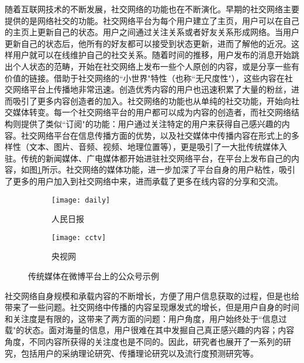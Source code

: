 随着互联网技术的不断发展，社交网络的功能也在不断演化。早期的社交网络主要提供的是网络社交的功能。社交网络平台为每个用户建立了主页，用户可以在自己的主页上更新自己的状态。用户之间通过关注关系或者好友关系形成网络。当用户更新自己的状态后，他所有的好友都可以接受到状态更新，进而了解他的近况。这样用户就可以在线维护自己的社交关系。随着时间的推移，用户发布的消息开始跳出个人状态的范畴，开始在社交网络上发布一些个人原创的内容，或是分享一些有价值的链接。借助于社交网络的``小世界"特性\citep{watts1998collective}（也称``无尺度性"\citep{barabasi1999emergence}）\citep{java2007we}，这些内容在社交网络平台上传播地非常迅速。创造优秀内容的用户也迅速积累了大量的粉丝，进而吸引了更多内容创造者的加入。社交网络的功能也从单纯的社交功能，开始向社交媒体转变\citep{hanna2011we,ellison2007social}。每一个社交网络平台的用户都可以成为内容的创造者，而社交网络结构则提供了类似``订阅"的功能：用户通过关注特定的用户来获得自己感兴趣的内容。社交网络平台在信息传播方面的优势，以及社交媒体中传播内容在形式上的多样性（文本、图片、音频、视频、地理位置等），更是吸引了一大批传统媒体入驻。传统的新闻媒体、广电媒体都开始进驻社交网络平台，在平台上发布自己的内容，如图\ref{fig:socialMedia}所示。社交网络的媒体功能，进一步加深了平台自身的用户粘性，吸引了更多的用户加入到社交网络中来，进而承载了更多在线内容的分享和交流。
\begin{figure}[!htb]
  \centering
  \begin{subfigure}[b]{0.4\textwidth}
    \texttt{[image: daily]}
    \caption{人民日报}
  \end{subfigure}%
  \hspace{0.05\textwidth}
  \begin{subfigure}[b]{0.4\textwidth}
    \texttt{[image: cctv]}
    \caption{央视网}
  \end{subfigure}
  \caption{传统媒体在微博平台上的公众号示例}
  \label{fig:socialMedia}
\end{figure}

社交网络自身规模和承载内容的不断增长，方便了用户信息获取的过程，但是也给带来了一些问题。社交网络中传播的内容呈现爆发式的增长，但是用户自身的时间和关注度是有限的，这带来了两方面的问题：用户角度，用户始终处于``信息过载"的状态。面对海量的信息，用户很难在其中发掘自己真正感兴趣的内容；内容角度，不同内容所获得的关注度也是不同的。因此，研究者也展开了一系列的研究，包括用户的采纳理论研究\citep{sledgianowski2008social,xu2008product,iyengar2011social,mansumitrchai2012factors}、传播理论研究\citep{bakshy2012role,gruhl2004information,guille2013information}以及流行度预测研究\citep{szabo2010predicting,pinto2013using}等。

